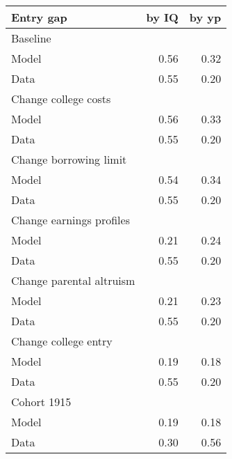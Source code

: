 \begin{tabular}{lrr}
\hline
Entry gap & by IQ  & by yp  \\ 
\hline
Baseline &   &   \\ 
Model & 0.56  & 0.32  \\ 
Data & 0.55  & 0.20  \\ 
Change college costs &   &   \\ 
Model & 0.56  & 0.33  \\ 
Data & 0.55  & 0.20  \\ 
Change borrowing limit &   &   \\ 
Model & 0.54  & 0.34  \\ 
Data & 0.55  & 0.20  \\ 
Change earnings profiles &   &   \\ 
Model & 0.21  & 0.24  \\ 
Data & 0.55  & 0.20  \\ 
Change parental altruism &   &   \\ 
Model & 0.21  & 0.23  \\ 
Data & 0.55  & 0.20  \\ 
Change college entry &   &   \\ 
Model & 0.19  & 0.18  \\ 
Data & 0.55  & 0.20  \\ 
Cohort 1915 &   &   \\ 
Model & 0.19  & 0.18  \\ 
Data & 0.30  & 0.56  \\ 
\hline
\end{tabular}%
